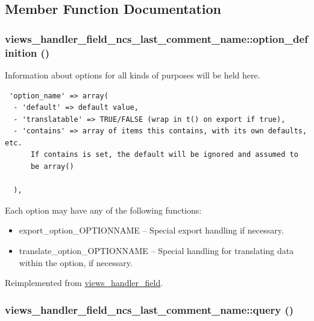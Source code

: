 \subsection{Member Function Documentation}
\hypertarget{classviews__handler__field__ncs__last__comment__name_ef3ee7ac3c57f689148d8909e0a3a3df}{
\subsubsection[{option\_\-definition}]{\setlength{\rightskip}{0pt plus 5cm}views\_\-handler\_\-field\_\-ncs\_\-last\_\-comment\_\-name::option\_\-definition ()}}
\label{classviews__handler__field__ncs__last__comment__name_ef3ee7ac3c57f689148d8909e0a3a3df}


Information about options for all kinds of purposes will be held here. 

\begin{Code}\begin{verbatim} 'option_name' => array(
  - 'default' => default value,
  - 'translatable' => TRUE/FALSE (wrap in t() on export if true),
  - 'contains' => array of items this contains, with its own defaults, etc.
      If contains is set, the default will be ignored and assumed to
      be array()

  ),
\end{verbatim}
\end{Code}

 Each option may have any of the following functions:\begin{itemize}
\item export\_\-option\_\-OPTIONNAME -- Special export handling if necessary.\item translate\_\-option\_\-OPTIONNAME -- Special handling for translating data within the option, if necessary. \end{itemize}


Reimplemented from \hyperlink{classviews__handler__field_64c69a8a3697603f8283405071c25b76}{views\_\-handler\_\-field}.\hypertarget{classviews__handler__field__ncs__last__comment__name_5394581513de0ee85a28aef8de302842}{
\subsubsection[{query}]{\setlength{\rightskip}{0pt plus 5cm}views\_\-handler\_\-field\_\-ncs\_\-last\_\-comment\_\-name::query ()}}
\label{classviews__handler__field__ncs__last__comment__name_5394581513de0ee85a28aef8de302842}


